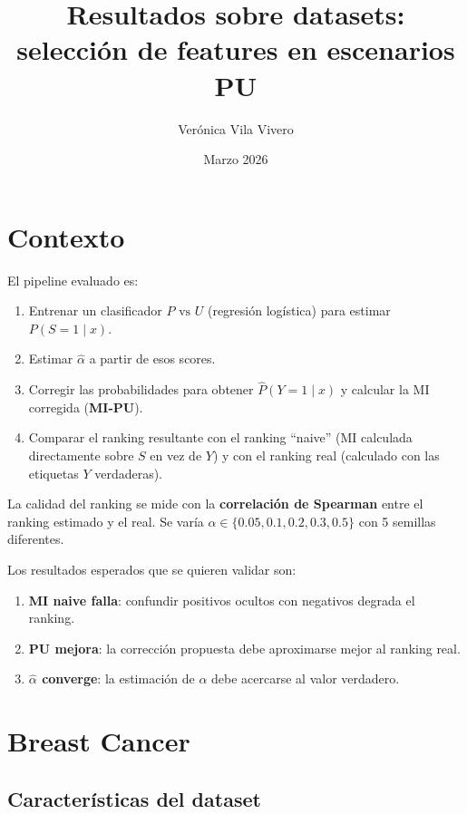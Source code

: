 \documentclass[a4paper,11pt]{article}
\title{\textbf{Resultados sobre datasets: selección de features en escenarios PU}}
\author{Verónica Vila Vivero}
\date{Marzo 2026}
\begin{document}
\maketitle
\tableofcontents
\newpage

\section{Contexto}

El pipeline evaluado es:
\begin{enumerate}
    \item Entrenar un clasificador $P \text{ vs } U$ (regresión logística) para estimar $P(S=1 \mid x)$.
    \item Estimar $\hat{\alpha}$ a partir de esos scores.
    \item Corregir las probabilidades para obtener $\hat{P}(Y=1 \mid x)$ y calcular la MI corregida (\textbf{MI-PU}).
    \item Comparar el ranking resultante con el ranking ``naive'' (MI calculada directamente sobre $S$ en vez de $Y$) y con el ranking real (calculado con las etiquetas $Y$ verdaderas).
\end{enumerate}

La calidad del ranking se mide con la \textbf{correlación de Spearman} entre el ranking estimado y el real. Se varía $\alpha \in \{0.05, 0.1, 0.2, 0.3, 0.5\}$ con 5 semillas diferentes.

\medskip
Los resultados esperados que se quieren validar son:
\begin{enumerate}
    \item[\textbf{H1}] \textbf{MI naive falla}: confundir positivos ocultos con negativos degrada el ranking.
    \item[\textbf{H2}] \textbf{PU mejora}: la corrección propuesta debe aproximarse mejor al ranking real.
    \item[\textbf{H3}] \textbf{$\hat{\alpha}$ converge}: la estimación de $\alpha$ debe acercarse al valor verdadero.
\end{enumerate}

\section{Breast Cancer}

\subsection{Características del dataset}
\end{document}
